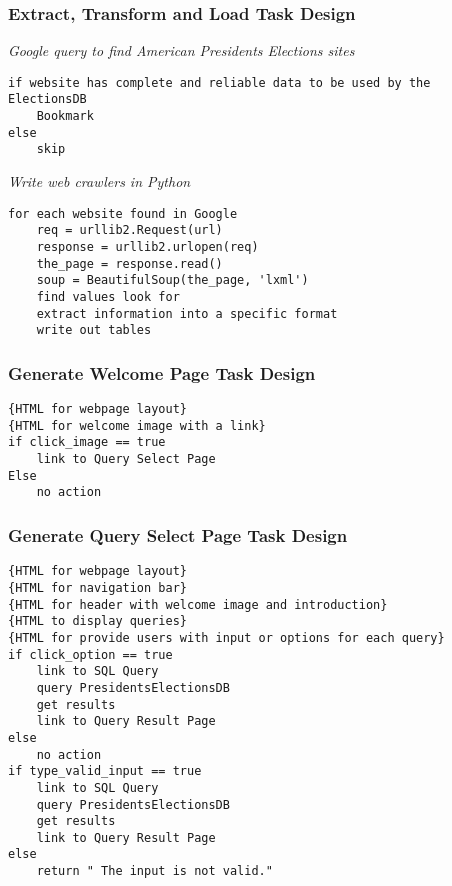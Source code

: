 \documentclass{article}
\begin{document}
\subsubsection{Extract, Transform and Load Task Design}
\emph{Google query to find American Presidents Elections sites}\\
\begin{lstlisting}
if website has complete and reliable data to be used by the ElectionsDB 
    Bookmark
else 
    skip
\end{lstlisting}

\noindent \emph{ Write web crawlers in Python}
\begin{lstlisting}
for each website found in Google
    req = urllib2.Request(url)
    response = urllib2.urlopen(req)
    the_page = response.read()
    soup = BeautifulSoup(the_page, 'lxml')
    find values look for
    extract information into a specific format
    write out tables
\end{lstlisting}

\subsubsection{Generate Welcome Page Task Design}
\begin{lstlisting}
{HTML for webpage layout}
{HTML for welcome image with a link}
if click_image == true
    link to Query Select Page
Else 
    no action
\end{lstlisting}

\subsubsection{Generate Query Select Page Task Design}
\begin{lstlisting}
{HTML for webpage layout}
{HTML for navigation bar}
{HTML for header with welcome image and introduction}
{HTML to display queries}
{HTML for provide users with input or options for each query}
if click_option == true 
    link to SQL Query
    query PresidentsElectionsDB
    get results
    link to Query Result Page
else 
    no action
if type_valid_input == true
    link to SQL Query
    query PresidentsElectionsDB
    get results
    link to Query Result Page
else
    return " The input is not valid."   
\end{lstlisting}
\end{document}
